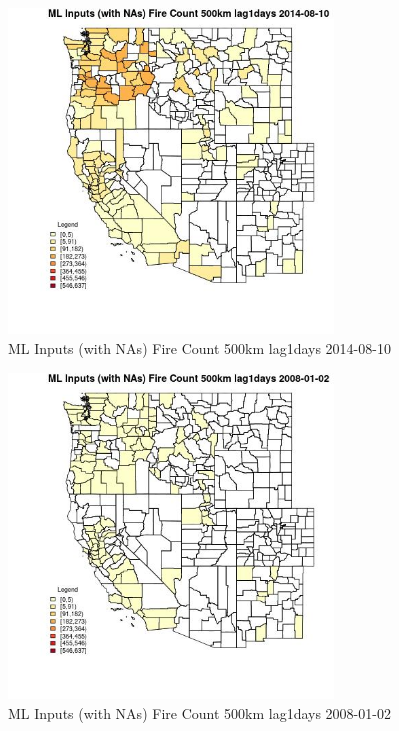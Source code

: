 \begin{figure} 
\centering  
\includegraphics[width=0.77\textwidth]{Code_Outputs/Report_ML_input_PM25_Step4_part_e_de_duplicated_aves_compiled_2019-05-18wNAs_CountyFire_Count_500km_lag1daysMean2014-08-10.jpg} 
\caption{\label{fig:Report_ML_input_PM25_Step4_part_e_de_duplicated_aves_compiled_2019-05-18wNAsCountyFire_Count_500km_lag1daysMean2014-08-10}ML Inputs (with NAs) Fire Count 500km lag1days 2014-08-10} 
\end{figure} 
 

\begin{figure} 
\centering  
\includegraphics[width=0.77\textwidth]{Code_Outputs/Report_ML_input_PM25_Step4_part_e_de_duplicated_aves_compiled_2019-05-18wNAs_CountyFire_Count_500km_lag1daysMean2008-01-02.jpg} 
\caption{\label{fig:Report_ML_input_PM25_Step4_part_e_de_duplicated_aves_compiled_2019-05-18wNAsCountyFire_Count_500km_lag1daysMean2008-01-02}ML Inputs (with NAs) Fire Count 500km lag1days 2008-01-02} 
\end{figure} 
 

